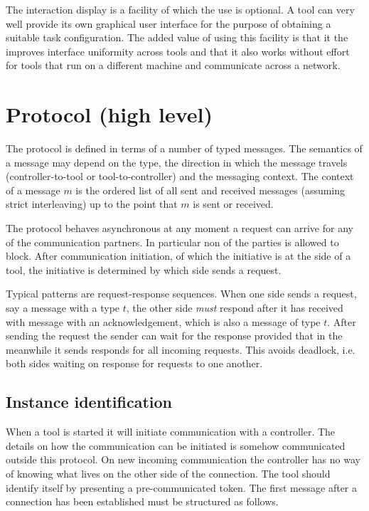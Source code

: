 \documentclass{article}
\begin{document}
   The interaction display is a facility of which the use is optional. A tool
   can very well provide its own graphical user interface for the purpose of
   obtaining a suitable task configuration. The added value of using this
   facility is that it the improves interface uniformity across tools and that
   it also works without effort for tools that run on a different machine and
   communicate across a network.

 \section{Protocol (high level)} \label{s:message_definitions}

  The protocol is defined in terms of a number of typed messages. The semantics
  of a message may depend on the type, the direction in which the message
  travels (controller-to-tool or tool-to-controller) and the messaging context.
  The context of a message $m$ is the ordered list of all sent and received
  messages (assuming strict interleaving) up to the point that $m$ is sent or
  received.

  The protocol behaves asynchronous at any moment a request can arrive for any
  of the communication partners. In particular non of the parties is allowed to
  block. After communication initiation, of which the initiative is at the side
  of a tool, the initiative is determined by which side sends a request.

  Typical patterns are request-response sequences. When one side sends a
  request, say a message with a type $t$, the other side \emph{must} respond
  after it has received with message with an acknowledgement, which is also a
  message of type $t$. After sending the request the sender can wait for the
  response provided that in the meanwhile it sends responds for all incoming
  requests. This avoids deadlock, i.e. both sides waiting on response for
  requests to one another.

  \subsection{Instance identification} \label{s:instance_identification}

   When a tool is started it will initiate communication with a controller.
   The details on how the communication can be initiated is somehow
   communicated outside this protocol. On new incoming communication the
   controller has no way of knowing what lives on the other side of the
   connection. The tool should identify itself by presenting a pre-communicated
   token. The first message after a connection has been established must be
   structured as follows.
   
\end{document}
